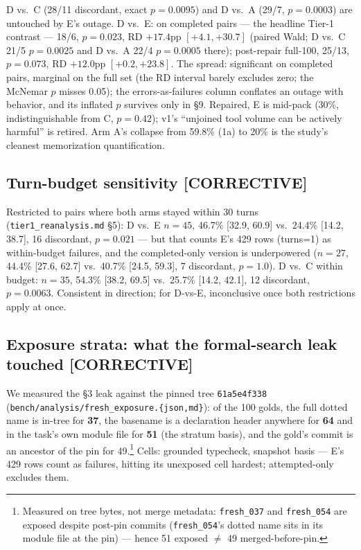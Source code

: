 \documentclass[10pt]{article}
\newcommand{\code}[1]{\texttt{#1}}
\begin{document}
D vs.\ C (28/11 discordant, exact $p=0.0095$) and D vs.\ A (29/7,
$p=0.0003$) are untouched by E's outage. D vs.\ E: on completed pairs ---
the headline Tier-1 contrast --- 18/6, $p=0.023$, RD $+17.4$pp
$[+4.1, +30.7]$ (paired Wald; D vs.\ C 21/5 $p=0.0025$ and D vs.\ A 22/4
$p=0.0005$ there); post-repair full-100, 25/13, $p=0.073$, RD $+12.0$pp
$[+0.2, +23.8]$. The spread: significant on completed pairs, marginal on
the full set (the RD interval barely excludes zero; the McNemar $p$ misses
0.05); the errors-as-failures column conflates an outage with behavior,
and its inflated $p$ survives only in \S9. Repaired, E is mid-pack (30\%,
indistinguishable from C, $p=0.42$); v1's ``unjoined tool volume can be
actively harmful'' is retired. Arm A's collapse from 59.8\% (1a) to 20\%
is the study's cleanest memorization quantification.

\subsection{Turn-budget sensitivity [CORRECTIVE]}\label{sec:budget}

Restricted to pairs where both arms stayed within 30 turns
(\code{tier1\_reanalysis.md} \S5): D vs.\ E $n=45$, 46.7\% [32.9, 60.9]
vs.\ 24.4\% [14.2, 38.7], 16 discordant, $p=0.021$ --- but that counts E's
429 rows (turns=1) as within-budget failures, and the completed-only
version is underpowered ($n=27$, 44.4\% [27.6, 62.7] vs.\ 40.7\%
[24.5, 59.3], 7 discordant, $p=1.0$). D vs.\ C within budget: $n=35$,
54.3\% [38.2, 69.5] vs.\ 25.7\% [14.2, 42.1], 12 discordant, $p=0.0063$.
Consistent in direction; for D-vs-E, inconclusive once both restrictions
apply at once.

\subsection{Exposure strata: what the formal-search leak touched
[CORRECTIVE]}\label{sec:exposure}

We measured the \S3 leak against the pinned tree \code{61a5e4f338}
(\code{bench/analysis/fresh\_exposure.\{json,md\}}): of the 100 golds, the
full dotted name is in-tree for \textbf{37}, the basename is a declaration
header anywhere for \textbf{64} and in the task's own module file for
\textbf{51} (the stratum basis), and the gold's commit is an ancestor of
the pin for 49.\footnote{Measured on tree bytes, not merge metadata:
\code{fresh\_037} and \code{fresh\_054} are exposed despite post-pin
commits (\code{fresh\_054}'s dotted name sits in its module file at the
pin) --- hence 51 exposed $\neq$ 49 merged-before-pin.} Cells: grounded
typecheck, snapshot basis --- E's 429 rows count as failures, hitting its
unexposed cell hardest; attempted-only excludes them.
\end{document}
